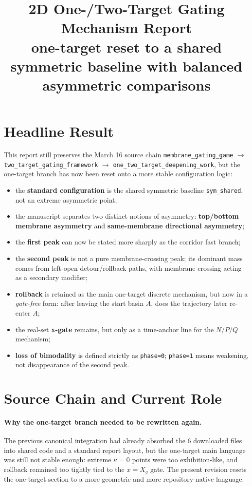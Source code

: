 \documentclass[11pt]{article}
\title{2D One-/Two-Target Gating Mechanism Report\\\large one-target reset to a shared symmetric baseline with balanced asymmetric comparisons}
\author{}
\date{}
\begin{document}
\maketitle

\section*{Headline Result}
This report still preserves the March 16 source chain
\texttt{membrane\_gating\_game}
$\rightarrow$
\texttt{two\_target\_gating\_framework}
$\rightarrow$
\texttt{one\_two\_target\_deepening\_work},
but the one-target branch has now been reset onto a more stable configuration logic:
\begin{itemize}
  \item the \textbf{standard configuration} is the shared symmetric baseline \texttt{sym\_shared}, not an extreme asymmetric point;
  \item the manuscript separates two distinct notions of asymmetry: \textbf{top/bottom membrane asymmetry} and \textbf{same-membrane directional asymmetry};
  \item the \textbf{first peak} can now be stated more sharply as the corridor fast branch;
  \item the \textbf{second peak} is not a pure membrane-crossing peak; its dominant mass comes from left-open detour/rollback paths, with membrane crossing acting as a secondary modifier;
  \item \textbf{rollback} is retained as the main one-target discrete mechanism, but now in a \emph{gate-free} form: after leaving the start basin $A$, does the trajectory later re-enter $A$;
  \item the real-set \textbf{x-gate} remains, but only as a time-anchor line for the $N/P/Q$ mechanism;
  \item \textbf{loss of bimodality} is defined strictly as \texttt{phase=0}; \texttt{phase=1} means weakening, not disappearance of the second peak.
\end{itemize}

\section{Source Chain and Current Role}
\paragraph{Why the one-target branch needed to be rewritten again.}
The previous canonical integration had already absorbed the 6 downloaded files into shared code and a standard report layout, but the one-target main language was still not stable enough: extreme $\kappa=0$ points were too exhibition-like, and rollback remained too tightly tied to the $x=X_g$ gate. The present revision resets the one-target section to a more geometric and more repository-native language.
\end{document}
